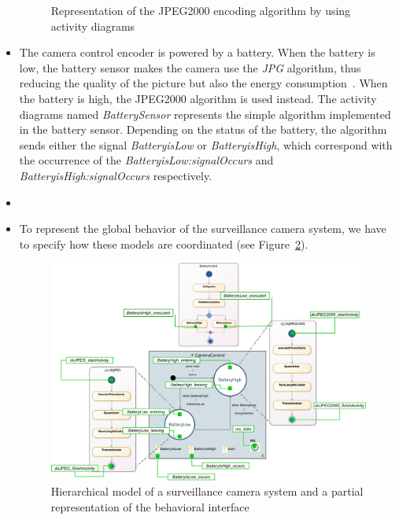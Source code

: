 \begin{itemize}
\begin{figure}
\begin{minipage}{0.45\textwidth}
			\caption{Representation of the JPEG2000 encoding algorithm by using activity diagrams}
			\label{fig:dojpeg2000}
		\end{minipage}
	\end{figure}
	



	\item The camera control encoder is powered by a battery. When the battery is low, the battery sensor makes the camera use the \emph{JPG} algorithm, thus reducing the quality of the picture but also the energy consumption~\cite{encodingcomparison}. When the battery is high, the JPEG2000 algorithm is used instead. The activity diagrams named \emph{BatterySensor} represents the simple algorithm implemented in the battery sensor. Depending on the status of the battery, the algorithm sends either the signal \emph{BatteryisLow} or \emph{BatteryisHigh}, which correspond with the occurrence of the \mse \emph{BatteryisLow:signalOccurs} and \emph{BatteryisHigh:signalOccurs} respectively.
	
	
	\item {}

	\item To represent the global behavior of the surveillance camera system, we have to specify how these models are coordinated (see Figure~\ref{fig:cameramodel}).
	
	
	
	\begin{figure}
		\center
		\includegraphics[width=1\columnwidth]{examples/figs/picmodels.pdf}
		\caption{Hierarchical model of a surveillance camera system and a partial representation of the behavioral interface}
		\label{fig:cameramodel}
	\end{figure}
	

\end{itemize}
